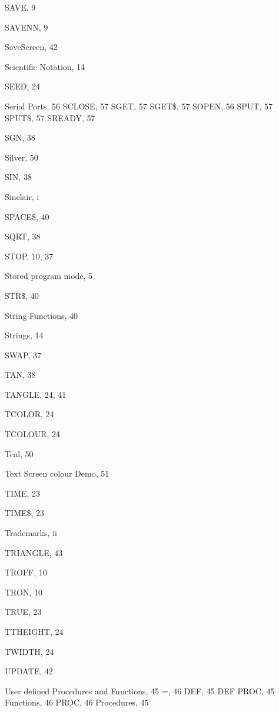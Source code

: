 \begin{theindex}
  \item SAVE, 9
  \item SAVENN, 9
  \item SaveScreen, 42
  \item Scientific Notation, 14
  \item SEED, 24
  \item Serial Ports, 56
    \subitem SCLOSE, 57
    \subitem SGET, 57
    \subitem SGET\$, 57
    \subitem SOPEN, 56
    \subitem SPUT, 57
    \subitem SPUT\$, 57
    \subitem SREADY, 57
  \item SGN, 38
  \item Silver, 50
  \item SIN, 38
  \item Sinclair, i
  \item SPACE\$, 40
  \item SQRT, 38
  \item STOP, 10, 37
  \item Stored program mode, 5
  \item STR\$, 40
  \item String Functions, 40
  \item Strings, 14
  \item SWAP, 37

  \indexspace

  \item TAN, 38
  \item TANGLE, 24, 41
  \item TCOLOR, 24
  \item TCOLOUR, 24
  \item Teal, 50
  \item Text Screen
    \subitem colour Demo, 51
  \item TIME, 23
  \item TIME\$, 23
  \item Trademarks, ii
  \item TRIANGLE, 43
  \item TROFF, 10
  \item TRON, 10
  \item TRUE, 23
  \item TTHEIGHT, 24
  \item TWIDTH, 24

  \indexspace

  \item UPDATE, 42
  \item User defined Procedures and Functions, 45
    \subitem =, 46
    \subitem DEF, 45
    \subitem DEF PROC, 45
    \subitem Functions, 46
    \subitem PROC, 46
    \subitem Procedures, 45


\end{theindex}
